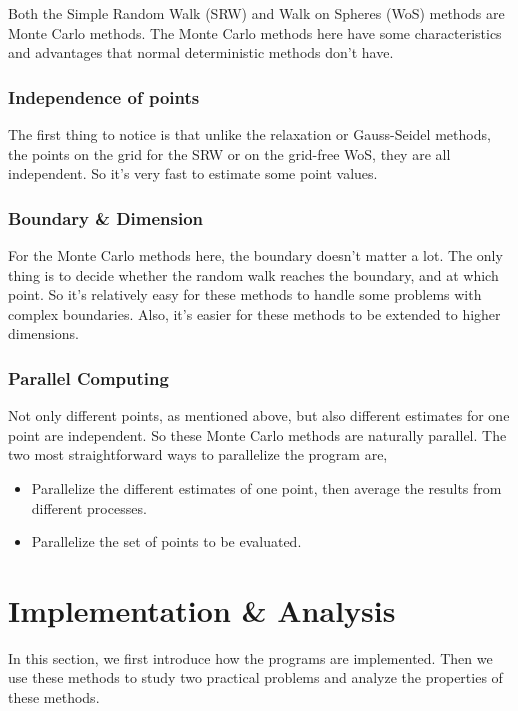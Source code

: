 \documentclass[aps, prl, reprint, groupedaddress]{revtex4-1}
\begin{document}
Both the Simple Random Walk (SRW) and Walk on Spheres (WoS) methods are Monte Carlo methods. The Monte Carlo methods here have some characteristics and advantages that normal deterministic methods don't have.

\subsubsection{Independence of points}

The first thing to notice is that unlike the relaxation or Gauss-Seidel methods, the points on the grid for the SRW or on the grid-free WoS, they are all independent. So it's very fast to estimate some point values.

\subsubsection{Boundary \& Dimension}

For the Monte Carlo methods here, the boundary doesn't matter a lot. The only thing is to decide whether the random walk reaches the boundary, and at which point. So it's relatively easy for these methods to handle some problems with complex boundaries. Also, it's easier for these methods to be extended to higher dimensions.

\subsubsection{Parallel Computing}

Not only different points, as mentioned above, but also different estimates for one point are independent. So these Monte Carlo methods are naturally parallel. The two most straightforward ways to parallelize the program are,
\begin{itemize}
    \item Parallelize the different estimates of one point, then average the results from different processes.
    \item Parallelize the set of points to be evaluated.
\end{itemize}


\section{Implementation \& Analysis}

In this section, we first introduce how the programs are implemented. Then we use these methods to study two practical problems and analyze the properties of these methods.
\end{document}
